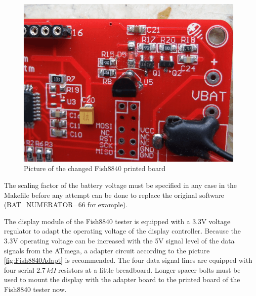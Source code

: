 \begin{figure}[H]
\centering
\includegraphics[width=12cm]{../PNG/Fish8840patch.png}
\caption{Picture of the changed Fish8840 printed board}
\label{fig:Fish8840patch}
\end{figure}

The scaling factor of the battery voltage must be specified in any case in the Makefile before any
attempt can be done to replace the original software (BAT\_NUMERATOR=66 for example).

The display module of the Fish8840 tester is equipped with a 3.3V voltage regulator to adapt
the operating voltage of the display controller.
Because the 3.3V operating voltage can be increased with the 5V signal level of the data signals
from the ATmega, a adapter circuit according to the picture \ref{fig:Fish8840Adapt} is recommended.
The four data signal lines are equipped with four serial \(2.7~k\Omega\) resistors at a little
breadboard.
Longer spacer bolts must be used to mount the display with the adapter board to the printed board
of the Fish8840 tester now.

